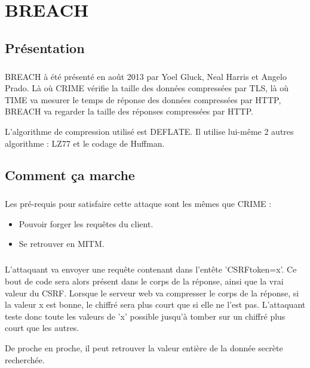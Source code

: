 \chapter{BREACH}
\label{chap:breach}

\section{Présentation}
\paragraph{}
BREACH à été présenté en août 2013 par Yoel Gluck, Neal Harris et Angelo Prado. Là où CRIME vérifie la taille des données compressées par TLS, là où TIME va mesurer le temps de réponse des données compressées par HTTP, BREACH va regarder la taille des réponses compressées par HTTP.

L'algorithme de compression utilisé est DEFLATE. Il utilise lui-même 2 autres algorithme : LZ77 et le codage de Huffman.

\section{Comment ça marche}
\paragraph{}
Les pré-requis pour satisfaire cette attaque sont les mêmes que CRIME :
\begin{itemize}
  \item Pouvoir forger les requêtes du client.
  \item Se retrouver en MITM.
\end{itemize}

\paragraph{}
L'attaquant va envoyer une requête contenant dans l'entête 'CSRFtoken=x'. Ce bout de code sera alors présent dans le corps de la réponse, ainsi que la vrai valeur du CSRF. Lorsque le serveur web va compresser le corps de la réponse, si la valeur x est bonne, le chiffré sera plus court que si elle ne l'est pas. L'attaquant teste donc toute les valeurs de 'x' possible jusqu'à tomber sur un chiffré plus court que les autres.

De proche en proche, il peut retrouver la valeur entière de la donnée secrète recherchée.\\

